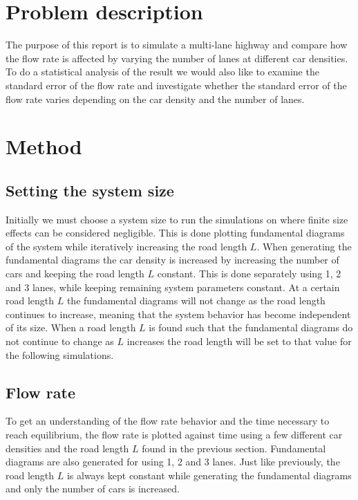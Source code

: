 \documentclass[a4paper,12pt]{article}
\begin{document}

\section*{Problem description}
The purpose of this report is to simulate a multi-lane highway and compare how the flow rate is affected by varying the number
of lanes at different car densities.
To do a statistical analysis of the result we would also like to examine the standard error of the flow rate and investigate whether the 
standard error of the flow rate varies depending on the car density and the number of lanes.

\section*{Method}
\subsection*{Setting the system size}
Initially we must choose a system size to run the simulations on where finite size effects can be considered negligible. This is done plotting fundamental
diagrams of the system while iteratively increasing the road length $L$. When generating the fundamental diagrams the car density is increased by increasing the number
of cars and keeping the road length $L$ constant. This is done separately using 1, 2 and 3 lanes, while keeping remaining system
parameters constant. At a certain road length $L$ the fundamental diagrams will not change as the road length
continues to increase, meaning that the system behavior has become independent of its size. When a road length $L$ is found such that the fundamental diagrams
do not continue to change as $L$ increases the road length will be set to that value for the following simulations.

\subsection*{Flow rate}
To get an understanding of the flow rate behavior and the time necessary to reach equilibrium, the flow rate is plotted against time using a few different 
car densities and the road length $L$ found in the previous section. Fundamental diagrams are also generated for using 1, 2 and 3 lanes. Just like previously,
the road length $L$ is always kept constant while generating the fundamental diagrams and only the number of cars is increased.
\end{document}
